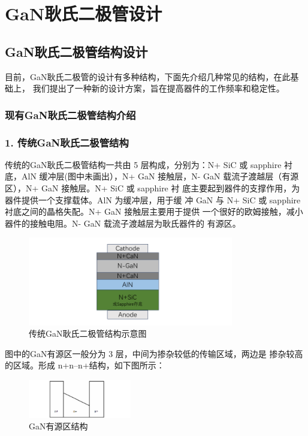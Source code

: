 \documentclass[12pt,hyperref,a4paper,UTF8]{ctexart}
\begin{document}
\newpage
\section{GaN耿氏二极管设计}

\subsection{GaN耿氏二极管结构设计}

目前，GaN耿氏二极管的设计有多种结构，下面先介绍几种常见的结构，在此基础上，
我们提出了一种新的设计方案，旨在提高器件的工作频率和稳定性。

\subsubsection{现有GaN耿氏二极管结构介绍}
\subsubsection*{1. 传统GaN耿氏二极管结构}

传统的GaN耿氏二极管结构一共由 5 层构成，分别为：N+
 SiC 或 sapphire 衬底，AlN 缓冲层(图中未画出），N+
 GaN
接触层，N-
 GaN 载流子渡越层（有源区），N+
 GaN 接触层。N+
 SiC 或 sapphire 衬
底主要起到器件的支撑作用，为器件提供一个支撑载体。AlN 为缓冲层，用于缓
冲 GaN 与 N+
 SiC 或 sapphire 衬底之间的晶格失配。N+
 GaN 接触层主要用于提供
一个很好的欧姆接触，减小器件的接触电阻。N-
 GaN 载流子渡越层为耿氏器件的
有源区。

\begin{figure}[H]
\centering
\includegraphics[width=0.8\textwidth]{figures/fig/image6.png}
\caption{传统GaN耿氏二极管结构示意图} 
\label{fig:image5}
\end{figure}
图中的GaN有源区一般分为 3 层，中间为掺杂较低的传输区域，两边是
掺杂较高的区域。形成 n+n–n+结构，如下图所示：



\begin{figure}[H]
\centering
\includegraphics[width=0.4\textwidth]{figures/fig/image7.png}
\caption{GaN有源区结构\cite{XXYD201302031}}
\label{fig:image5}

\end{figure}
\end{document}
